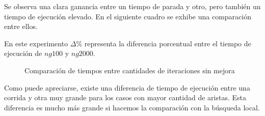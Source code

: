 Se observa una clara ganancia entre un tiempo de parada y otro, pero también
un tiempo de ejecución elevado. En el siguiente cuadro se exhibe una
comparación entre ellos.

En este experimento $\Delta\%$ representa la diferencia porcentual entre el
tiempo de ejecución de $ng 100$ y $ng 2000$.

\begin{figure}[H]
    \centering
    \caption{Comparación de tiempos entre cantidades de iteraciones sin mejora}
    \pgfplotstabletypeset[
        columns={0, localsearchtime, highiterationlowernogainlowaspirationtime, highiterationhighnogainlowaspirationtime, rationogaintime}
    ]{\optimalsolutions}
\end{figure}

Como puede apreciarse, existe una diferencia de tiempo de ejecución entre una
corrida y otra muy grande para los casos con mayor cantidad de aristas.
Esta diferencia es mucho más grande si hacemos la comparación con la búsqueda
local.
